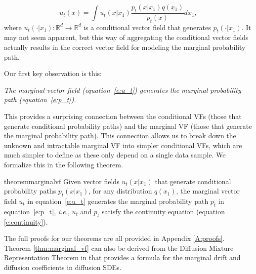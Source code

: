 \documentclass{article}
\makeatletter
\newcommand{\Real}{\mathbb R}
\newcommand{\too}{\rightarrow}
\newcommand{\ie}{{i.e.}}
\def\eqref#1{equation~\ref{#1}}
\newcommand{\E}{\mathbb{E}}
\renewcommand*{\ie}{{\it i.e.}\@\xspace}
\makeatother
\begin{document}
%
\begin{equation}\label{e:u_t}
    u_t(x) 
    = \int u_t(x\vert x_1) \frac{p_t(x\vert x_1)q(x_1)}{p_t(x)}dx_1,
\end{equation}
where $u_t(\cdot|x_1):\Real^d\too\Real^d$ is a conditional vector field that generates $p_t(\cdot\vert x_1)$. It may not seem apparent, but this way of aggregating the conditional vector fields actually results in the correct vector field for modeling the marginal probability path.

Our first key observation is this:
\vspace{-0.5em}
\begin{center}			%
    \colorbox{mygray} {		%
      \begin{minipage}{0.977\linewidth} 	%
       \centering
        \emph{The marginal vector field (\eqref{e:u_t}) generates the marginal probability path (\eqref{e:p_t}).}
      \end{minipage}}			%
\end{center}
This provides a surprising connection between the conditional VFs (those that generate conditional probability paths) and the marginal VF (those that generate the marginal probability path). This connection allows us to break down the unknown and intractable marginal VF into simpler conditional VFs, which are much simpler to define as these only depend on a single data sample. We formalize this in the following theorem.
\begin{restatable}{theorem}{marginalvf}\label{thm:marginal_vf}
Given vector fields $u_t(x|x_1)$ that generate conditional probability paths $p_t(x|x_1)$, for any distribution $q(x_1)$, the marginal vector field $u_t$ in \eqref{e:u_t} generates the marginal probability path $p_t$ in \eqref{e:p_t}, \ie, $u_t$ and $p_t$ satisfy the continuity equation (equation \ref{e:continuity}).
\end{restatable}
The full proofs for our theorems are all provided in Appendix \ref{A:proofs}. Theorem \ref{thm:marginal_vf} can also be derived from the Diffusion Mixture Representation Theorem in \cite{peluchetti2021non} that provides a formula for the marginal drift and diffusion coefficients in diffusion SDEs.
\end{document}
